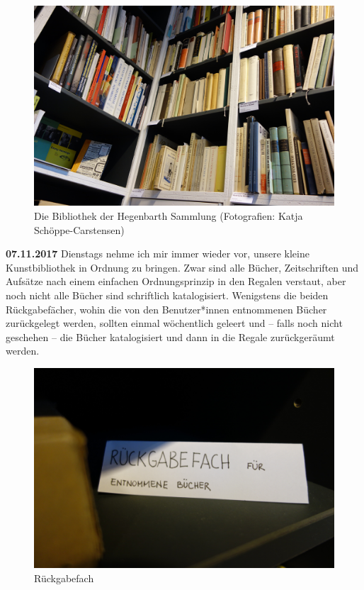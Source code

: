 \documentclass[a4paper,
fontsize=11pt,
oneside,
numbers=noperiodatend,
parskip=half-,
bibliography=totoc,
final
]{scrartcl}
\begin{document}
\begin{figure}
\centering
\includegraphics{img/Schoeppe_2.jpg}
\caption{Die Bibliothek der Hegenbarth Sammlung (Fotografien: Katja
Schöppe-Carstensen)}
\end{figure}

\textbf{07.11.2017} Dienstags nehme ich mir immer wieder vor, unsere
kleine Kunstbibliothek in Ordnung zu bringen. Zwar sind alle Bücher,
Zeitschriften und Aufsätze nach einem einfachen Ordnungsprinzip in den
Regalen verstaut, aber noch nicht alle Bücher sind schriftlich
katalogisiert. Wenigstens die beiden Rückgabefächer, wohin die von den
Benutzer*innen entnommenen Bücher zurückgelegt werden, sollten einmal
wöchentlich geleert und -- falls noch nicht geschehen -- die Bücher
katalogisiert und dann in die Regale zurückgeräumt werden.

\begin{figure}
\centering
\includegraphics{img/Schoeppe_3.jpg}
\caption{Rückgabefach}
\end{figure}
\end{document}
